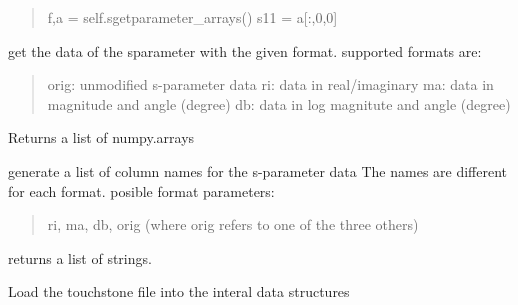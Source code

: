 \documentclass[letterpaper,10pt,english]{sphinxmanual}
\begin{document}
\begin{fulllineitems}
\begin{fulllineitems}
\begin{quote}
f,a = self.sgetparameter\_arrays()
s11 = a{[}:,0,0{]}
\end{quote}

\end{fulllineitems}


\begin{fulllineitems}
\label{api/mwavepy:mwavepy.touchstone.touchstone.get_sparameter_data}
get the data of the sparameter with the given format.
supported formats are:
\begin{quote}

orig:  unmodified s-parameter data
ri:    data in real/imaginary
ma:    data in magnitude and angle (degree)
db:    data in log magnitute and angle (degree)
\end{quote}

Returns a list of numpy.arrays

\end{fulllineitems}


\begin{fulllineitems}
\label{api/mwavepy:mwavepy.touchstone.touchstone.get_sparameter_names}
generate a list of column names for the s-parameter data
The names are different for each format.
posible format parameters:
\begin{quote}

ri, ma, db, orig  (where orig refers to one of the three others)
\end{quote}

returns a list of strings.

\end{fulllineitems}


\begin{fulllineitems}
\label{api/mwavepy:mwavepy.touchstone.touchstone.load_file}
Load the touchstone file into the interal data structures

\end{fulllineitems}


\end{fulllineitems}
\end{document}
